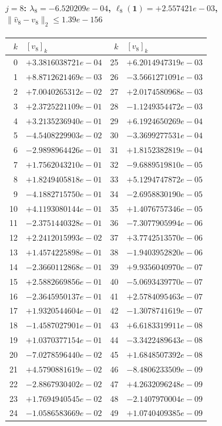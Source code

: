 \documentclass[11pt]{article}
\begin{document}
\paragraph{$j = 8$: $\lambda_{8} = -6.520209e-04$, \quad $\ell_{8}(\mathbf{1}) = +2.557421e-03$, \quad $\|\hat{v}_{8} - v_{8}\|_2 \leq 1.39e-156$}
\begin{center}
{\footnotesize
\begin{tabular}{r@{\;\;}l@{\quad}r@{\;\;}l}
\toprule
$k$ & $[v_{8}]_k$ & $k$ & $[v_{8}]_k$ \\
\midrule
0 & $+3.3816038721e-04$ & 25 & $+6.2014947319e-03$ \\
1 & $+8.8712621469e-03$ & 26 & $-3.5661271091e-03$ \\
2 & $+7.0040265312e-02$ & 27 & $+2.0174580968e-03$ \\
3 & $+2.3725221109e-01$ & 28 & $-1.1249354472e-03$ \\
4 & $+3.2135236940e-01$ & 29 & $+6.1924650269e-04$ \\
5 & $-4.5408229903e-02$ & 30 & $-3.3699277531e-04$ \\
6 & $-2.9898964426e-01$ & 31 & $+1.8152382819e-04$ \\
7 & $+1.7562043210e-01$ & 32 & $-9.6889519810e-05$ \\
8 & $+1.8249405818e-01$ & 33 & $+5.1294747872e-05$ \\
9 & $-4.1882715750e-01$ & 34 & $-2.6958830190e-05$ \\
10 & $+4.1193080144e-01$ & 35 & $+1.4076757346e-05$ \\
11 & $-2.3751440328e-01$ & 36 & $-7.3077905994e-06$ \\
12 & $+2.2412015993e-02$ & 37 & $+3.7742513570e-06$ \\
13 & $+1.4574225898e-01$ & 38 & $-1.9403952820e-06$ \\
14 & $-2.3660112868e-01$ & 39 & $+9.9356040970e-07$ \\
15 & $+2.5882669856e-01$ & 40 & $-5.0693439770e-07$ \\
16 & $-2.3645950137e-01$ & 41 & $+2.5784095463e-07$ \\
17 & $+1.9320544604e-01$ & 42 & $-1.3078741619e-07$ \\
18 & $-1.4587027901e-01$ & 43 & $+6.6183319911e-08$ \\
19 & $+1.0370377154e-01$ & 44 & $-3.3422489643e-08$ \\
20 & $-7.0278596440e-02$ & 45 & $+1.6848507392e-08$ \\
21 & $+4.5790881619e-02$ & 46 & $-8.4806233509e-09$ \\
22 & $-2.8867930402e-02$ & 47 & $+4.2632096248e-09$ \\
23 & $+1.7694940545e-02$ & 48 & $-2.1407970004e-09$ \\
24 & $-1.0586583669e-02$ & 49 & $+1.0740409385e-09$ \\
\bottomrule
\end{tabular}
}
\end{center}
\end{document}
